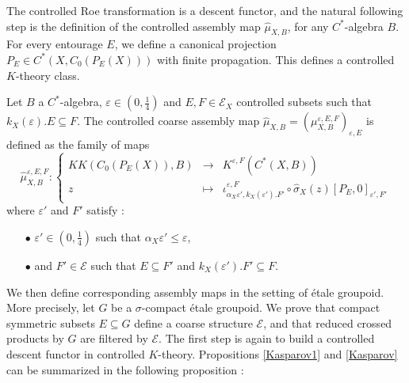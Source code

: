 The controlled Roe transformation is a descent functor, and the natural following step is the definition of the controlled assembly map $\hat\mu_{X,B}$, for any $C^*$-algebra $B$. For every entourage $E$, we define a canonical projection $P_E\in C^*(X,C_0(P_E(X)))$ with finite propagation. This defines a controlled $K$-theory class.         

\begin{definition}
Let $B$ a $C^*$-algebra, $\varepsilon\in (0,\frac{1}{4})$ and $E,F\in\mathcal E_X$ controlled subsets such that $k_X(\varepsilon).E\subseteq F$. The controlled coarse assembly map $\hat\mu_{X,B}=(\mu_{X,B}^{\varepsilon,E,F})_{\varepsilon,E}$ is defined as the family of maps
\[\hat\mu_{X,B}^{\varepsilon, E,F} :\left\{\begin{array}{rcl} KK(C_0(P_E(X)),B) & \rightarrow & K^{\varepsilon, F}(C^*(X,B)) \\
					z & \mapsto & \iota_{\alpha_X \varepsilon',k_X(\varepsilon').F'}^{\varepsilon,F}\circ\hat\sigma_X(z)[P_{E},0]_{\varepsilon', F'}\end{array}\right.\]
where $\varepsilon'$ and $F'$ satisfy :
\begin{itemize}
\item[$\bullet$] $\varepsilon'\in (0,\frac{1}{4})$ such that $\alpha_X \varepsilon'\leq \varepsilon$,
\item[$\bullet$] and $F'\in\mathcal E$ such that $E\subseteq F'$ and $k_X(\varepsilon').F'\subseteq F$.
\end{itemize}
\end{definition}

We then define corresponding assembly maps in the setting of étale groupoid. More precisely, let $G$ be a $\sigma$-compact étale groupoid. We prove that compact symmetric subsets $E\subseteq G$ define a coarse structure $\mathcal E$, and that reduced crossed products by $G$ are filtered by $\mathcal E$. The first step is again to build a controlled descent functor in controlled $K$-theory. Propositions \ref{Kasparov1} and \ref{Kasparov} can be summarized in the following proposition : 

